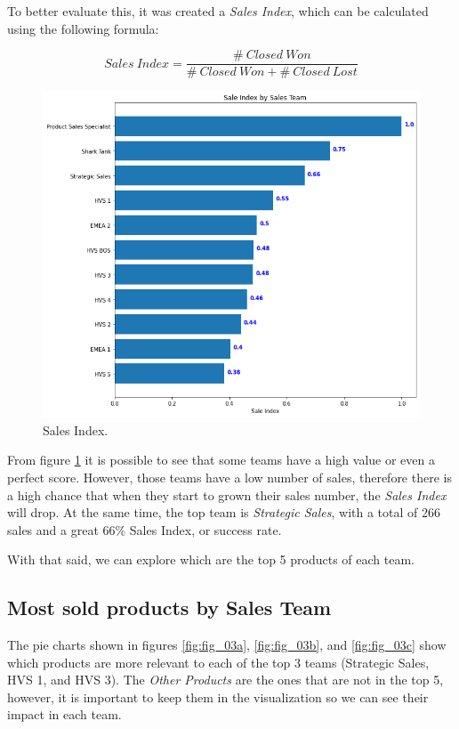 \documentclass[]{report}
\begin{document}
To better evaluate this, it was created a \textit{Sales Index}, which can be calculated using the following formula:

\begin{equation}
	Sales\:Index = \frac{\#\:Closed\:Won}{\#\:Closed\:Won + \#\:Closed\:Lost}
\end{equation}

\begin{figure}[htb]
	\centering
	\includegraphics[width=1\textwidth]{fig_02_sales_index}
	\caption{Sales Index.}
	\label{fig:fig_02}
\end{figure}

From figure \textcolor{blue}{\ref{fig:fig_02}} it is possible to see that some teams have a high value or even a perfect score. However, those teams have a low number of sales, therefore there is a high chance that when they start to grown their sales number, the \textit{Sales Index} will drop. At the same time, the top team is \textit{Strategic Sales}, with a total of 266 sales and a great 66\% Sales Index, or success rate.

With that said, we can explore which are the top 5 products of each team.

\subsection{Most sold products by Sales Team}

The pie charts shown in figures \textcolor{blue}{\ref{fig:fig_03a}}, \textcolor{blue}{\ref{fig:fig_03b}}, and \textcolor{blue}{\ref{fig:fig_03c}} show which products are more relevant to each of the top 3 teams (Strategic Sales, HVS 1, and HVS 3). The \textit{Other Products} are the ones that are not in the top 5, however, it is important to keep them in the visualization so we can see their impact in each team.
\end{document}
